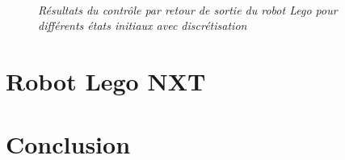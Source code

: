 \documentclass[11pt,french]{article} %
\begin{document}
\begin{figure}[H]%
	\centering
	\noindent{} \\
		\captionsetup{justification=centering}
		\caption{\textit{Résultats du contrôle par retour de sortie du robot Lego pour différents états initiaux avec discrétisation}}
		\label{fig:robot_discret}%
\end{figure}
\vspace{0.5cm}


\newpage
\section{Robot Lego NXT}

\newpage
\section*{Conclusion}
\end{document}
